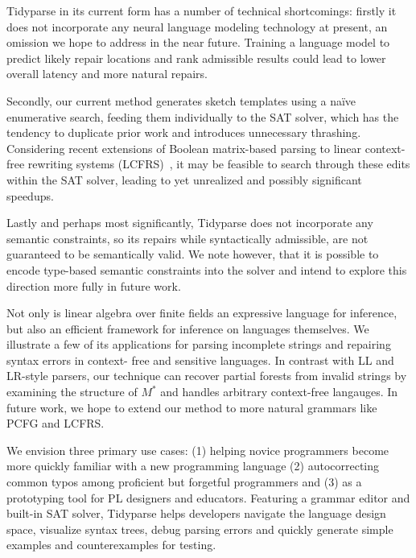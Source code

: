 \documentclass[sigplan,review,anonymous,acmsmall]{acmart}\settopmatter{printfolios=false,printccs=false,printacmref=false}
\begin{document}
Tidyparse in its current form has a number of technical shortcomings: firstly it does not incorporate any neural language modeling technology at present, an omission we hope to address in the near future. Training a language model to predict likely repair locations and rank admissible results could lead to lower overall latency and more natural repairs.

Secondly, our current method generates sketch templates using a na\"ive enumerative search, feeding them individually to the SAT solver, which has the tendency to duplicate prior work and introduces unnecessary thrashing. Considering recent extensions of Boolean matrix-based parsing to linear context-free rewriting systems (LCFRS)~\cite{cohen2016parsing}, it may be feasible to search through these edits within the SAT solver, leading to yet unrealized and possibly significant speedups.

Lastly and perhaps most significantly, Tidyparse does not incorporate any semantic constraints, so its repairs while syntactically admissible, are not guaranteed to be semantically valid. We note however, that it is possible to encode type-based semantic constraints into the solver and intend to explore this direction more fully in future work.

Not only is linear algebra over finite fields an expressive language for inference, but also an efficient framework for inference on languages themselves. We illustrate a few of its applications for parsing incomplete strings and repairing syntax errors in context- free and sensitive languages. In contrast with LL and LR-style parsers, our technique can recover partial forests from invalid strings by examining the structure of $M^*$ and handles arbitrary context-free langauges. In future work, we hope to extend our method to more natural grammars like PCFG and LCFRS.

We envision three primary use cases: (1) helping novice programmers become more quickly familiar with a new programming language (2) autocorrecting common typos among proficient but forgetful programmers and (3) as a prototyping tool for PL designers and educators. Featuring a grammar editor and built-in SAT solver, Tidyparse helps developers navigate the language design space, visualize syntax trees, debug parsing errors and quickly generate simple examples and counterexamples for testing. %
\end{document}
